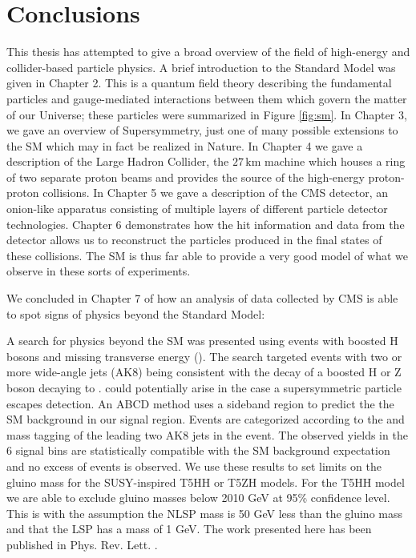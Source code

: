 \chapter{Conclusions}
\label{chap:conclusions}

This thesis has attempted to give a broad overview of the field of high-energy and collider-based particle physics. A brief introduction to the Standard Model was given in Chapter 2. This is a quantum field theory describing the fundamental particles and gauge-mediated interactions between them which govern the matter of our Universe; these particles were summarized in Figure \ref{fig:sm}. In Chapter 3, we gave an overview of Supersymmetry, just one of many possible extensions to the SM which may in fact be realized in Nature. In Chapter 4 we gave a description of the Large Hadron Collider, the $27\,\mathrm{km}$ machine which houses a ring of two separate proton beams and provides the source of the high-energy proton-proton collisions. In Chapter 5 we gave a description of the CMS detector, an onion-like apparatus consisting of multiple layers of different particle detector technologies. Chapter 6 demonstrates how the hit information and data from the detector allows us to reconstruct the particles produced in the final states of these collisions. The SM is thus far able to provide a very good model of what we observe in these sorts of experiments.

We concluded in Chapter 7 of how an analysis of data collected by CMS is able to spot signs of physics beyond the Standard Model:

A search for physics beyond the SM was presented using events with boosted H bosons and missing transverse energy (\ptmiss). The search targeted events with two or more wide-angle jets (AK8) being consistent with the decay of a boosted H or Z boson decaying to \bbbar. \ptmiss could potentially arise in the case a supersymmetric particle escapes detection. An ABCD method uses a sideband region to predict the the SM background in our signal region. Events are categorized according to the \bbbar and mass tagging of the leading two AK8 jets in the event. The observed yields in the 6 signal bins are statistically compatible with the SM background expectation and no excess of events is observed. We use these results to set limits on the gluino mass for the SUSY-inspired T5HH or T5ZH models. For the T5HH model we are able to exclude gluino masses below 2010 GeV at 95\% confidence level. This is with the assumption the NLSP mass is 50 GeV less than the gluino mass and that the LSP has a mass of 1 GeV. The work presented here has been published in Phys. Rev. Lett. \cite{CMS-SUS-17-006}.
